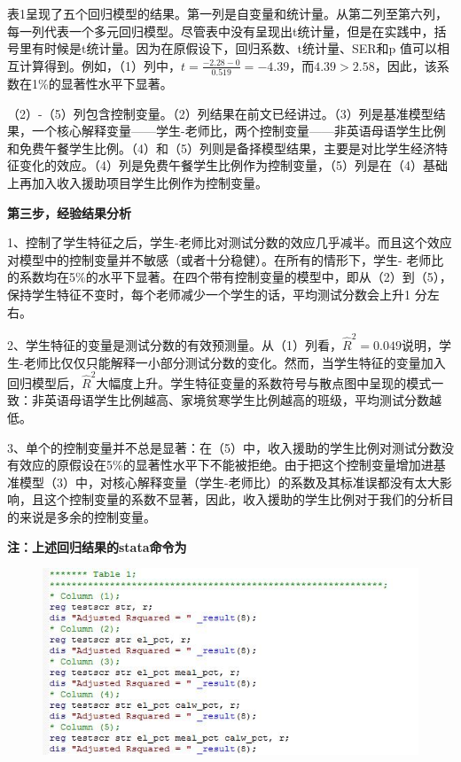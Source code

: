 \documentclass[cn,10pt,math=newtx,citestyle=gb7714-2015,bibstyle=gb7714-2015]{elegantbook}
\begin{document}
	表1呈现了五个回归模型的结果。第一列是自变量和统计量。从第二列至第六列，每一列代表一个多元回归模型。尽管表中没有呈现出t统计量，但是在实践中，括号里有时候是t统计量。因为在原假设下，回归系数、t统计量、SER和p 值可以相互计算得到。例如，（1）列中，$t=\frac{-2.28-0}{0.519}=-4.39$，而$4.39>2.58$，因此，该系数在1\%的显著性水平下显著。
	
	（2）-（5）列包含控制变量。（2）列结果在前文已经讲过。（3）列是基准模型结果，一个核心解释变量——学生-老师比，两个控制变量——非英语母语学生比例和免费午餐学生比例。（4）和（5）列则是备择模型结果，主要是对比学生经济特征变化的效应。（4）列是免费午餐学生比例作为控制变量，（5）列是在（4）基础上再加入收入援助项目学生比例作为控制变量。
	
	\textbf{第三步，经验结果分析}
	
	1、控制了学生特征之后，学生-老师比对测试分数的效应几乎减半。而且这个效应对模型中的控制变量并不敏感（或者十分稳健）。在所有的情形下，学生- 老师比的系数均在5\%的水平下显著。在四个带有控制变量的模型中，即从（2）到（5），保持学生特征不变时，每个老师减少一个学生的话，平均测试分数会上升1 分左右。
	
	2、学生特征的变量是测试分数的有效预测量。从（1）列看，$\hat{R}^2=0.049$说明，学生-老师比仅仅只能解释一小部分测试分数的变化。然而，当学生特征的变量加入回归模型后，$\hat{R}^2$大幅度上升。学生特征变量的系数符号与散点图中呈现的模式一致：非英语母语学生比例越高、家境贫寒学生比例越高的班级，平均测试分数越低。
	
	3、单个的控制变量并不总是显著：在（5）中，收入援助的学生比例对测试分数没有效应的原假设在5\%的显著性水平下不能被拒绝。由于把这个控制变量增加进基准模型（3）中，对核心解释变量（学生-老师比）的系数及其标准误都没有太大影响，且这个控制变量的系数不显著，因此，收入援助的学生比例对于我们的分析目的来说是多余的控制变量。
	
	\textbf{注：上述回归结果的stata命令为}
	\begin{figure}[htbp]
		\centering
		\includegraphics[width=1\textwidth]{cmd.jpg}
	\end{figure}
\end{document}

